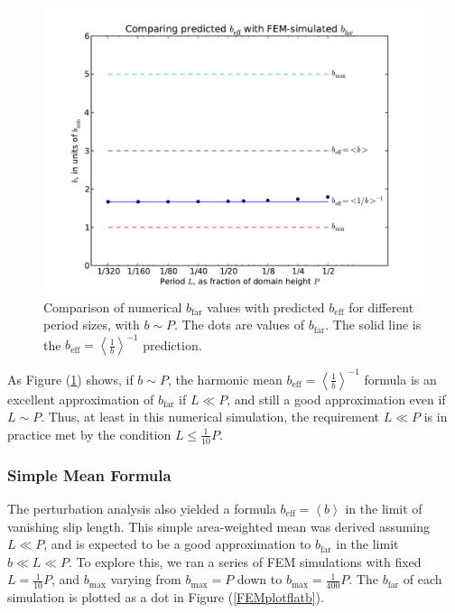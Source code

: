 \documentclass[12pt, a4paper, twoside, openright]{book}
\newcommand{\beff}{\ensuremath{b_{\mathrm{eff}}}}
\newcommand{\bmax}{\ensuremath{b_{\mathrm{max}}}}
\newcommand{\bfar}{\ensuremath{b_{\mathrm{far}}}}
\newcommand{\beffh}{\ensuremath{b_{\mathrm{eff}}} = \left< \frac{1}{b} \right>^{-1} }
\newcommand{\beffm}{\ensuremath{b_{\mathrm{eff}}} = \left< b \right> }
\begin{document}
\begin{figure}[ht]
\includegraphics[scale=0.595]{Lund_Thesis_FEM_plot_flat_L}
\caption{Comparison of numerical $\bfar$ values with predicted $\beff$ for different period sizes, with $b \sim P$.  The dots are values of $\bfar$.  The solid line is the $\beffh$ prediction.}\label{FEMplotflatL}
\end{figure}

As Figure (\ref{FEMplotflatL}) shows, if $b \sim P$, the harmonic mean $\beffh$ formula is an excellent approximation of $\bfar$ if $L \ll P$, and still a good approximation even if $L \sim P$.  Thus, at least in this numerical simulation, the requirement $L \ll P$ is in practice met by the condition $L \leq \frac{1}{10}P$.

\clearpage
\subsubsection{Simple Mean Formula}

The perturbation analysis also yielded a formula $\beffm$ in the limit of vanishing slip length.  This simple area-weighted mean was derived assuming $L \ll P$, and is expected to be a good approximation to $\bfar$ in the limit $b \ll L \ll P$.  To explore this, we ran a series of FEM simulations with fixed $L = \frac{1}{10}P$, and $\bmax$ varying from $\bmax = P$ down to $\bmax = \frac{1}{400}P$.  The $\bfar$ of each simulation is plotted as a dot in Figure (\ref{FEMplotflatb}).
\end{document}
